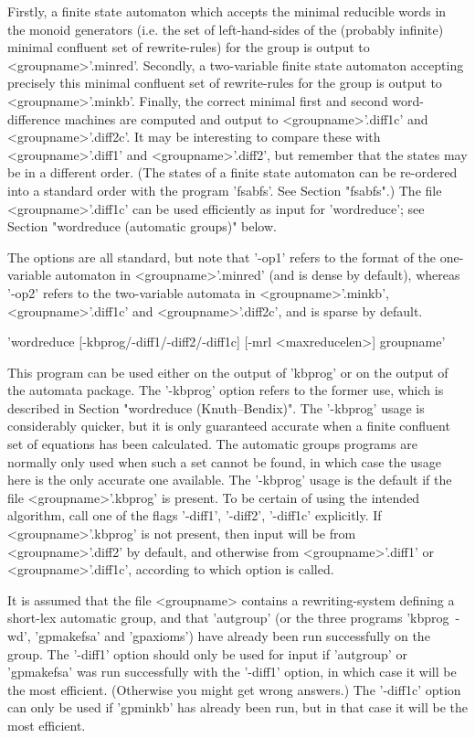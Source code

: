 Firstly, a finite state automaton which accepts the
minimal reducible words in the monoid generators (i.e. the set of
left-hand-sides  of the (probably infinite) minimal confluent set of
rewrite-rules) for the group is output to <groupname>'.minred'.
Secondly, a two-variable finite state automaton accepting precisely
this minimal confluent set of rewrite-rules
for the group is output to <groupname>'.minkb'.
Finally, the correct minimal first and second word-difference machines are
computed and output to <groupname>'.diff1c' and <groupname>'.diff2c'.
It may be interesting to compare these with <groupname>'.diff1' and
<groupname>'.diff2', but remember that the states may be in a different
order. (The states of a finite state automaton can be re-ordered into a
standard order with the program 'fsabfs'. See Section "fsabfs".)
The file <groupname>'.diff1c' can be used efficiently as input for
'wordreduce'; see Section "wordreduce (automatic groups)" below.

The options are all standard, but note that '-op1' refers to the format
of the one-variable automaton in <groupname>'.minred' (and is dense by
default), whereas '-op2' refers to the two-variable automata in
<groupname>'.minkb', <groupname>'.diff1c' and <groupname>'.diff2c',
and is sparse by default.

'wordreduce  [-kbprog/-diff1/-diff2/-diff1c] [-mrl <maxreducelen>] groupname'

This program can be used either on the output of 'kbprog' or on the output
of the automata package. The '-kbprog' option refers to the former use,
which is described in Section "wordreduce (Knuth--Bendix)".
The '-kbprog' usage is considerably quicker, but it is only guaranteed
accurate when a finite confluent set of equations has been calculated. 
The automatic groups programs are normally only used when such a set
cannot be found, in which case the usage here is the only
accurate one available.
The '-kbprog' usage is the default if the file <groupname>'.kbprog' is present.
To be certain of using the intended algorithm, call one of the flags
'-diff1', '-diff2', '-diff1c' explicitly.
If <groupname>'.kbprog' is not present, then input will be from
<groupname>'.diff2' by default, and otherwise from <groupname>'.diff1'
or <groupname>'.diff1c', according to which option is called.

It is assumed that the file <groupname> contains a rewriting-system
defining a short-lex automatic group,
and that 'autgroup' (or the three programs 'kbprog\ -wd', 'gpmakefsa'
and 'gpaxioms') have already been run successfully on the group.
The '-diff1' option should only be used for input if  'autgroup' or
'gpmakefsa' was run successfully with the '-diff1' option, in which
case it will be the most efficient. (Otherwise you might get wrong answers.)
The  '-diff1c' option can only be used if 'gpminkb' has already been run,
but in that case it will be the most efficient.

